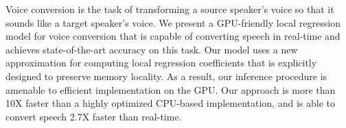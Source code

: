Voice conversion is the task of transforming a source speaker's voice so that it sounds like a target speaker's voice. We present a GPU-friendly local regression model for voice conversion that is capable of converting speech in real-time and achieves state-of-the-art accuracy on this task. Our model uses a new approximation for computing local regression coefficients that is explicitly designed to preserve memory locality. As a result, our inference procedure is amenable to efficient implementation on the GPU. Our approach is more than 10X faster than a highly optimized CPU-based implementation, and is able to convert speech 2.7X faster than real-time.

